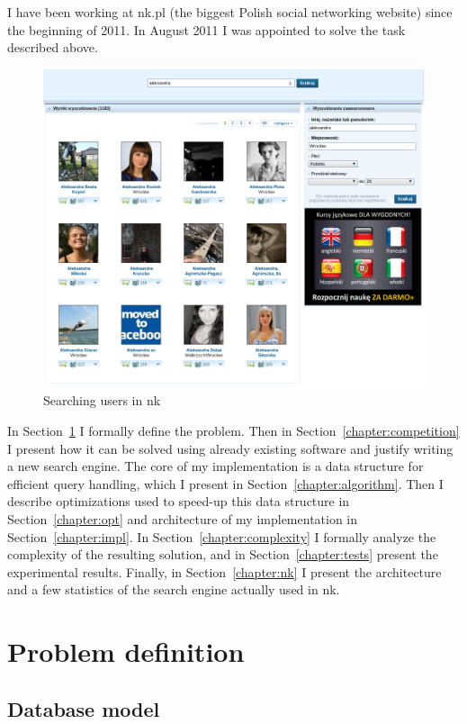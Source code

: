 \documentclass[10pt,a4paper]{article}
\begin{document}
I have been working at nk.pl (the biggest Polish social networking website) since the beginning of 2011. In August 2011 I was appointed to solve the task described above. 

\begin{figure}[!ht]
\centering
  \includegraphics[width=12cm]{nk_search}
  \caption{Searching users in nk}
  \label{fig:nk_search}
\end{figure}

In Section~\ref{chapter:problem} I formally define the problem. Then in Section~\ref{chapter:competition} I present how it can be solved using already existing software and justify writing a new search engine. The core of my implementation is a data structure for efficient query handling, which I present in Section~\ref{chapter:algorithm}. Then I describe optimizations used to speed-up this data structure in Section~\ref{chapter:opt} and architecture of my implementation in Section~\ref{chapter:impl}. In Section~\ref{chapter:complexity} I formally analyze the complexity of the resulting solution, and in Section~\ref{chapter:tests} present the experimental results. Finally, in Section~\ref{chapter:nk} I present the architecture and a few statistics of the search engine actually used in nk.

\section{Problem definition}
\label{chapter:problem}

\subsection{Database model}
\end{document}
